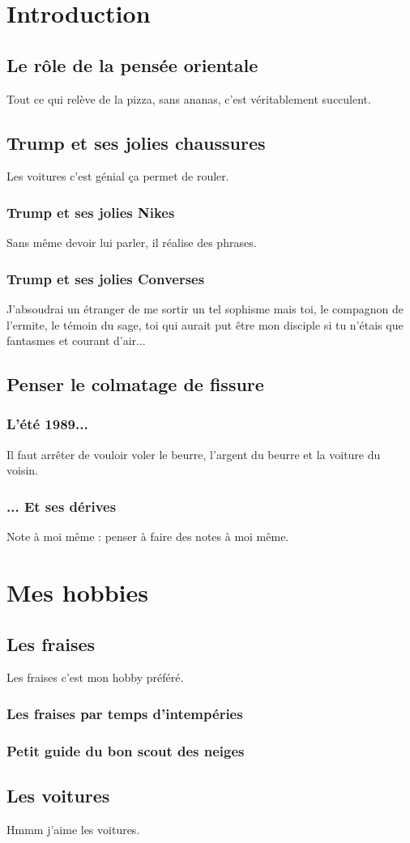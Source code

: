 \documentclass{article}
\begin{document}
\maketitle

\section{Introduction}
\subsection{Le rôle de la pensée orientale}
Tout ce qui relève de la pizza, sans ananas, c'est véritablement succulent.

\subsection{Trump et ses jolies chaussures}
Les voitures c'est génial ça permet de rouler.
\subsubsection{Trump et ses jolies Nikes}
Sans même devoir lui parler, il réalise des phrases.
\subsubsection{Trump et ses jolies Converses}
J'absoudrai un étranger de me sortir un tel sophisme mais toi, le compagnon de l'ermite, le témoin du sage, toi qui aurait put être mon disciple si tu n'étais que fantasmes et courant d'air...
\subsection{Penser le colmatage de fissure}
\subsubsection{L'été 1989...}
Il faut arrêter de vouloir voler le beurre, l'argent du beurre et la voiture du voisin.
\subsubsection{... Et ses dérives}
Note à moi même : penser à faire des notes à moi même.

\section{Mes hobbies}
\subsection{Les fraises}
Les fraises c'est mon hobby préféré.
\subsubsection{Les fraises par temps d'intempéries}
\subsubsection{Petit guide du bon scout des neiges}
\subsection{Les voitures}
Hmmm j'aime les voitures.
\end{document}

